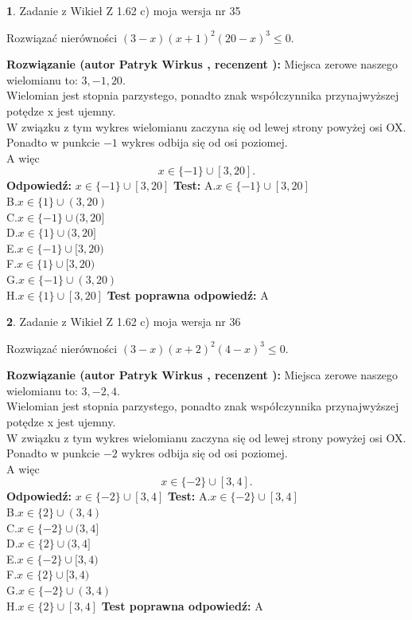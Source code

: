 \documentclass[12pt, a4paper]{article}
\theoremstyle{definition} %
\newtheorem{zad}{}
\newcommand{\zadStart}[1]{\begin{zad}#1\newline}
\newcommand{\zadStop}{\end{zad}}
\newcommand{\rozwStart}[2]{\noindent \textbf{Rozwiązanie (autor #1 , recenzent #2): }\newline}
\newcommand{\rozwStop}{\newline}
\newcommand{\odpStart}{\noindent \textbf{Odpowiedź:}\newline}
\newcommand{\odpStop}{\newline}
\newcommand{\testStart}{\noindent \textbf{Test:}\newline}
\newcommand{\testStop}{\newline}
\newcommand{\kluczStart}{\noindent \textbf{Test poprawna odpowiedź:}\newline}
\newcommand{\kluczStop}{\newline}
\begin{document}
\zadStart{Zadanie z Wikieł Z 1.62 c) moja wersja nr 35}

Rozwiązać nierówności $(3-x)(x+1)^{2}(20-x)^{3}\le0$.
\zadStop
\rozwStart{Patryk Wirkus}{}
Miejsca zerowe naszego wielomianu to: $3, -1, 20$.\\
Wielomian jest stopnia parzystego, ponadto znak współczynnika przy\linebreak najwyższej potędze x jest ujemny.\\ W związku z tym wykres wielomianu zaczyna się od lewej strony powyżej osi OX.\\
Ponadto w punkcie $-1$ wykres odbija się od osi poziomej.\\
A więc $$x \in \{-1\} \cup [3,20].$$
\rozwStop
\odpStart
$x \in \{-1\} \cup [3,20]$
\odpStop
\testStart
A.$x \in \{-1\} \cup [3,20]$\\
B.$x \in \{1\} \cup (3,20)$\\
C.$x \in \{-1\} \cup (3,20]$\\
D.$x \in \{1\} \cup (3,20]$\\
E.$x \in \{-1\} \cup [3,20)$\\
F.$x \in \{1\} \cup [3,20)$\\
G.$x \in \{-1\} \cup (3,20)$\\
H.$x \in \{1\} \cup [3,20]$
\testStop
\kluczStart
A
\kluczStop



\zadStart{Zadanie z Wikieł Z 1.62 c) moja wersja nr 36}

Rozwiązać nierówności $(3-x)(x+2)^{2}(4-x)^{3}\le0$.
\zadStop
\rozwStart{Patryk Wirkus}{}
Miejsca zerowe naszego wielomianu to: $3, -2, 4$.\\
Wielomian jest stopnia parzystego, ponadto znak współczynnika przy\linebreak najwyższej potędze x jest ujemny.\\ W związku z tym wykres wielomianu zaczyna się od lewej strony powyżej osi OX.\\
Ponadto w punkcie $-2$ wykres odbija się od osi poziomej.\\
A więc $$x \in \{-2\} \cup [3,4].$$
\rozwStop
\odpStart
$x \in \{-2\} \cup [3,4]$
\odpStop
\testStart
A.$x \in \{-2\} \cup [3,4]$\\
B.$x \in \{2\} \cup (3,4)$\\
C.$x \in \{-2\} \cup (3,4]$\\
D.$x \in \{2\} \cup (3,4]$\\
E.$x \in \{-2\} \cup [3,4)$\\
F.$x \in \{2\} \cup [3,4)$\\
G.$x \in \{-2\} \cup (3,4)$\\
H.$x \in \{2\} \cup [3,4]$
\testStop
\kluczStart
A
\kluczStop
\end{document}

